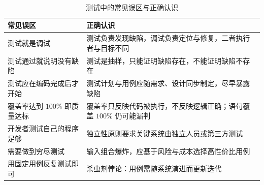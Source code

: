 \begin{table}[H]
\centering
\caption{测试中的常见误区与正确认识}
\begin{tabulary}{\textwidth}{LL}
\toprule
常见误区 & 正确认识 \\
\midrule
测试就是调试 & 测试负责发现缺陷，调试负责定位与修复，二者执行者与目标不同 \\
测试通过就说明没有缺陷 & 测试是抽样，只能证明缺陷存在，不能证明缺陷不存在 \\
测试应在编码完成后才开始 & 测试计划与用例应随需求、设计同步制定，尽早暴露缺陷 \\
覆盖率达到 $100\%$ 即质量达标 & 覆盖率只反映代码被执行，不反映逻辑正确；语句覆盖 $100\%$ 仍可能漏判 \\
开发者测试自己的程序足够 & 独立性原则要求关键系统由独立人员或第三方测试 \\
需要做到穷尽测试 & 输入组合爆炸，应基于风险与成本选择高性价比用例 \\
用固定用例反复测试即可 & 杀虫剂悖论：用例需随系统演进而更新迭代 \\
\bottomrule
\end{tabulary}
\end{table}
